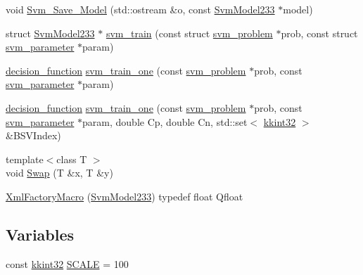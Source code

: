 \begin{DoxyCompactItemize}
\item 
void \hyperlink{namespace_s_v_m233_a55c3449500e55e93eea07e6754dc8651}{Svm\+\_\+\+Save\+\_\+\+Model} (std\+::ostream \&o, const \hyperlink{struct_s_v_m233_1_1_svm_model233}{Svm\+Model233} $\ast$model)
\item 
struct \hyperlink{struct_s_v_m233_1_1_svm_model233}{Svm\+Model233} $\ast$ \hyperlink{namespace_s_v_m233_a0f6331f1d29cc73bc32f39c104b8d74c}{svm\+\_\+train} (const struct \hyperlink{struct_s_v_m233_1_1svm__problem}{svm\+\_\+problem} $\ast$prob, const struct \hyperlink{struct_s_v_m233_1_1svm__parameter}{svm\+\_\+parameter} $\ast$param)
\item 
\hyperlink{struct_s_v_m233_1_1decision__function}{decision\+\_\+function} \hyperlink{namespace_s_v_m233_ae780865cb44de65b61e2228df26c9c18}{svm\+\_\+train\+\_\+one} (const \hyperlink{struct_s_v_m233_1_1svm__problem}{svm\+\_\+problem} $\ast$prob, const \hyperlink{struct_s_v_m233_1_1svm__parameter}{svm\+\_\+parameter} $\ast$param)
\item 
\hyperlink{struct_s_v_m233_1_1decision__function}{decision\+\_\+function} \hyperlink{namespace_s_v_m233_adcfc2ea7644b3f92e1550e7b31b17347}{svm\+\_\+train\+\_\+one} (const \hyperlink{struct_s_v_m233_1_1svm__problem}{svm\+\_\+problem} $\ast$prob, const \hyperlink{struct_s_v_m233_1_1svm__parameter}{svm\+\_\+parameter} $\ast$param, double Cp, double Cn, std\+::set$<$ \hyperlink{namespace_k_k_b_a8fa4952cc84fda1de4bec1fbdd8d5b1b}{kkint32} $>$ \&B\+S\+V\+Index)
\item 
{\footnotesize template$<$class T $>$ }\\void \hyperlink{namespace_s_v_m233_aba73cf189d50b3a4379e512f9ea2a303}{Swap} (T \&x, T \&y)
\item 
\hyperlink{namespace_s_v_m233_a131098eda06b17541792e71789d496f4}{Xml\+Factory\+Macro} (\hyperlink{struct_s_v_m233_1_1_svm_model233}{Svm\+Model233})                                                                   typedef float Qfloat
\end{DoxyCompactItemize}
\subsection*{Variables}
\begin{DoxyCompactItemize}
\item 
const \hyperlink{namespace_k_k_b_a8fa4952cc84fda1de4bec1fbdd8d5b1b}{kkint32} \hyperlink{namespace_s_v_m233_ae1643f090e7a6208a5cce9731bc529f7}{S\+C\+A\+LE} = 100
\end{DoxyCompactItemize}


